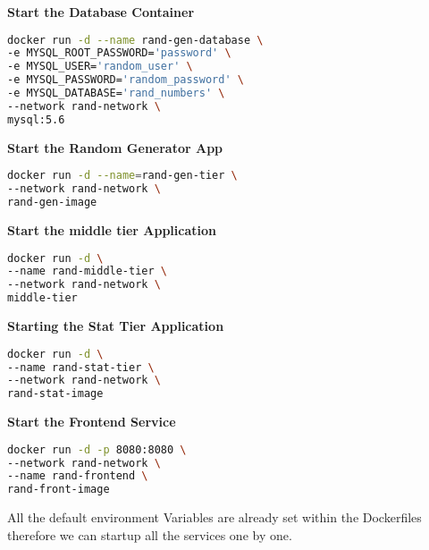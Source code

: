 \textbf{Start the Database Container}

\begin{lstlisting}[language=Bash]
docker run -d --name rand-gen-database \
-e MYSQL_ROOT_PASSWORD='password' \
-e MYSQL_USER='random_user' \
-e MYSQL_PASSWORD='random_password' \
-e MYSQL_DATABASE='rand_numbers' \
--network rand-network \
mysql:5.6
\end{lstlisting}

\textbf{Start the Random Generator App}
\begin{lstlisting}[language=Bash]
docker run -d --name=rand-gen-tier \
--network rand-network \
rand-gen-image
\end{lstlisting}

\textbf{Start the middle tier Application}
\begin{lstlisting}[language=Bash]
docker run -d \
--name rand-middle-tier \
--network rand-network \
middle-tier
\end{lstlisting}

\textbf{Starting the Stat Tier Application}
\begin{lstlisting}[language=Bash]
docker run -d \
--name rand-stat-tier \
--network rand-network \ 
rand-stat-image
\end{lstlisting}

\textbf{Start the Frontend Service}
\begin{lstlisting}[language=Bash]
docker run -d -p 8080:8080 \
--network rand-network \
--name rand-frontend \
rand-front-image
\end{lstlisting}

All the default environment Variables are already set within the Dockerfiles therefore we can startup all the services one by one.
